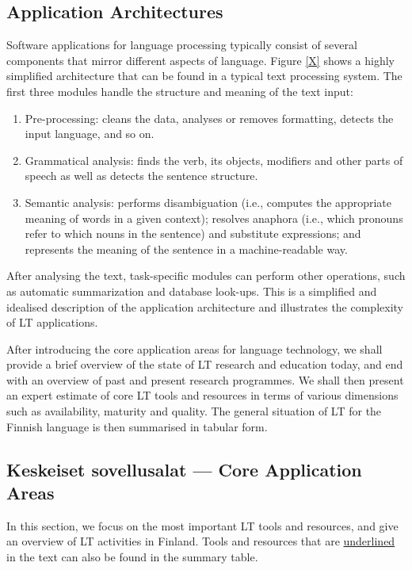\documentclass[]{../../metanetpaper}
\begin{document}
\begin{multicols}{2}
\subsection{Application Architectures}

Software applications for language processing typically consist of
several components that mirror different aspects of language.
Figure \ref{X} shows a highly simplified architecture that can be found in a
typical text processing system. The first three modules handle the
structure and meaning of the text input:

\begin{enumerate}
\item Pre-processing: cleans the data, analyses or removes formatting,
detects the input language, and so on.

\item Grammatical analysis: finds the verb, its objects, modifiers and
other parts of speech as well as detects the sentence structure.

\item Semantic analysis: performs disambiguation (i.e., computes the
appropriate meaning of words in a given context); resolves anaphora
(i.e., which pronouns refer to which nouns in the sentence) and
substitute expressions; and represents the meaning of the sentence in
a machine-readable way.
\end{enumerate}
After analysing the text, task-specific modules can perform other
operations, such as automatic summarization and database
look-ups. This is a simplified and idealised description of the
application architecture and illustrates the complexity of LT
applications.

After introducing the core application areas for language technology,
we shall provide a brief overview of the state of LT research and
education today, and end with an overview of past and present research
programmes. We shall then present an expert estimate of core LT tools
and resources in terms of various dimensions such as availability,
maturity and quality. The general situation of LT for the Finnish
language is then summarised in tabular form.

\subsection{Keskeiset sovellusalat --- Core Application Areas}

In this section, we focus on the most important LT tools and
resources, and give an overview of LT activities in Finland. Tools and
resources that are \underline{underlined} in the text can also be
found in the summary table.



\end{multicols}
\end{document}
